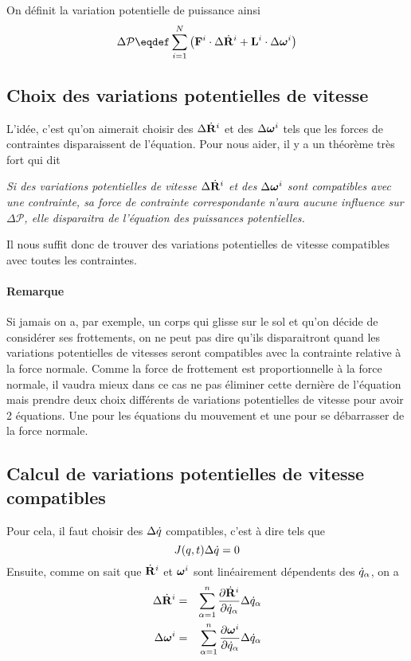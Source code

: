 On définit la variation potentielle de puissance ainsi
\[ \Delta \mathcal{P} \eqdef \sum_{i = 1}^N \left(\fv{F}^i \cdot \Delta \xgd^i + \st^i \cdot \Delta \omegaf^i\right) \]

\subsection{Choix des variations potentielles de vitesse}
L'idée, c'est qu'on aimerait choisir des $\Delta \dot{\bf R}^i$ et des $\Delta {\bm \omega}^i$ tels que les forces de contraintes disparaissent de l'équation.
Pour nous aider, il y a un théorème très fort qui dit
\begin{center}
	{\it
	Si des variations potentielles de vitesse $\Delta \dot{\bf R}^i$ et des
    $\Delta {\bm \omega}^i$ sont compatibles avec une contrainte,
    sa force de contrainte correspondante n'aura aucune influence
    sur $\Delta \mathcal{P}$,
    elle disparaitra de l'équation des puissances potentielles.
	}
\end{center}

Il nous suffit donc de trouver des variations potentielles de vitesse compatibles avec toutes les contraintes.

\paragraph{Remarque}
Si jamais on a, par exemple, un corps qui glisse sur le sol et qu'on décide de considérer ses frottements,
on ne peut pas dire qu'ils disparaitront quand les variations potentielles de vitesses seront compatibles avec la contrainte relative à la force normale.
Comme la force de frottement est proportionnelle à la force normale, il vaudra mieux dans ce cas ne pas éliminer cette dernière de l'équation mais prendre deux choix différents de variations potentielles de vitesse pour avoir 2 équations.
Une pour les équations du mouvement et une pour se débarrasser de la force normale.

\subsection{Calcul de variations potentielles de vitesse compatibles}
Pour cela, il faut choisir des $\Delta \dot{q}$ compatibles, c'est à dire tels que
\[ J(q, t) \Delta \dot{q} = 0 \]
Ensuite,
comme on sait que $\dot{\bf R}^i$ et ${\bm \omega}^i$
sont linéairement dépendents des $\dot{q}_\alpha$, on a
\begin{eqnarray*}
	\Delta \dot{\bf R}^i &=& \sum_{\alpha = 1}^n \frac{\partial \dot{\bf R}^i}{\partial \dot{q}_\alpha} \Delta \dot{q}_\alpha\\
	\Delta {\bm \omega}^i &=& \sum_{\alpha = 1}^n \frac{\partial {\bm \omega}^i}{\partial \dot{q}_\alpha} \Delta \dot{q}_\alpha
\end{eqnarray*}

